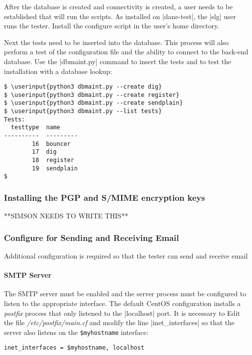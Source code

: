 \documentclass[preprint,3p,11pt]{elsarticle}
\newcommand\userinput[1]{\textbf{#1}}
\begin{document}
After the database is created and connectivity is created, a user
needs to be established that will run the scripts. As installed on
|dane-test|, the |slg| user runs the tester.   Install the configure
script in the user's home directory.

Next the tests need to be inserted into the database. This process
will also perform a test of the configuration file and the ability to
connect to the back-end database. Use the |dbmaint.py| command to
insert the tests and to test the installation with a database lookup:

\begin{Verbatim}[commandchars=\\\{\},fontsize=\small]
$ \userinput{python3 dbmaint.py --create dig}
$ \userinput{python3 dbmaint.py --create register}
$ \userinput{python3 dbmaint.py --create sendplain}
$ \userinput{python3 dbmaint.py --list tests}
Tests:
  testtype  name
----------  ---------
        16  bouncer
        17  dig
        18  register
        19  sendplain
$
\end{Verbatim}

\subsubsection{Installing the PGP and S/MIME encryption keys}
**SIMSON NEEDS TO WRITE THIS**
\subsubsection{Configure for Sending and Receiving Email}

Additional configuration is required so that the tester can send and receive email

\paragraph{SMTP Server}

The SMTP server must be enabled and the server process must be
configured to listen to the appropriate interface. The default CentOS
configuration installs a \emph{postfix} process that only listened to
the |localhost| port. It is necessary to Edit the file
  \emph{/etc/postfix/main.cf} and modify the line |inet_interfaces| so
  that the server also listens on the \texttt{\$myhostname} interface:

\begin{Verbatim}[commandchars=\\\{\},fontsize=\small]
inet_interfaces = $myhostname, localhost
\end{Verbatim}
\end{document}
